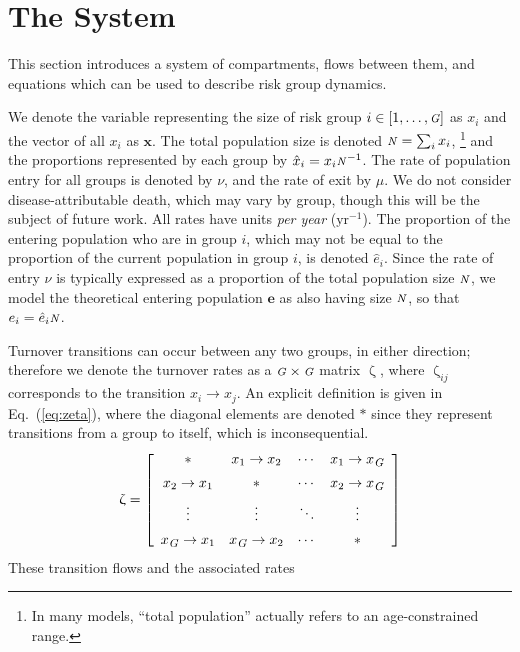 \documentclass[10pt]{article}
\numberwithin{equation}{section}
\renewcommand{\zeta}{\upzeta}
\newcommand{\N}{{\mbox{\footnotesize{\textit{N}}}}}
\newcommand{\G}{{\mbox{\footnotesize{\textit{G}}}}}
\begin{document}
\section{The System}\label{s:system}
This section introduces a system of compartments, flows between them, and equations
which can be used to describe risk group dynamics.
\par
We denote the variable representing
the size of risk group $i \in [1, \dots, \G]$ as $x_i$
and the vector of all $x_i$ as $\bm{x}$.
The total population size is denoted $\N = \sum_i x_i$,%
\footnote{In many models, ``total population'' actually refers to
  an age-constrained range.}
and the proportions represented by each group by $\hat{x}_i = x_i \N^{-1}$.
The rate of population entry for all groups is denoted by $\nu$, and
the rate of exit by $\mu$.
We do not consider disease-attributable death, which may vary by group,
though this will be the subject of future work.
All rates have units \textit{per year} ($\mathrm{yr}^{-1}$).
The proportion of the entering population who are in group $i$,
which may not be equal to the proportion of the current population in group $i$,
is denoted $\hat{e}_i$.
Since the rate of entry $\nu$ is typically expressed as
a proportion of the total population size $\N$,%
we model the theoretical entering population $\bm{e}$ as also having size $\N$,
so that $e_i = \hat{e}_i \N$.
\par
Turnover transitions can occur between any two groups, in either direction;
therefore we denote the turnover rates as a $\G \times \G$ matrix $\zeta$,
where $\zeta_{ij}$ corresponds to the transition $x_i \rightarrow x_j$.
An explicit definition is given in Eq.~(\ref{eq:zeta}),
where the diagonal elements are denoted $*$ since they represent
transitions from a group to itself, which is inconsequential.
\begin{equation}\label{eq:zeta}
\zeta = \left[\begin{array}{cccc}
         *           & x_1  \rightarrow x_2 & \cdots & x_1 \rightarrow x_\G \\[0.5em]
x_2  \rightarrow x_1 &          *           & \cdots & x_2 \rightarrow x_\G \\[0.5em]
      \vdots         &       \vdots         & \ddots &       \vdots         \\[0.5em]
x_\G \rightarrow x_1 & x_\G \rightarrow x_2 & \cdots &          *
\end{array}\right]
\end{equation}
These transition flows and the associated rates
\end{document}
